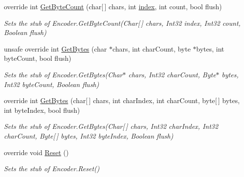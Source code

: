 \begin{DoxyCompactItemize}
override int \hyperlink{class_system_1_1_text_1_1_fakes_1_1_stub_encoder_a6904f965460c8aa5b7b448141afa6d9a}{Get\-Byte\-Count} (char\mbox{[}$\,$\mbox{]} chars, int \hyperlink{jquery-1_810_82-vsdoc_8js_a75bb12d1f23302a9eea93a6d89d0193e}{index}, int count, bool flush)
\begin{DoxyCompactList}\small\item\em Sets the stub of Encoder.\-Get\-Byte\-Count(\-Char\mbox{[}$\,$\mbox{]} chars, Int32 index, Int32 count, Boolean flush)\end{DoxyCompactList}\item 
unsafe override int \hyperlink{class_system_1_1_text_1_1_fakes_1_1_stub_encoder_ad76eecff905f03e290087c9421fff4e2}{Get\-Bytes} (char $\ast$chars, int char\-Count, byte $\ast$bytes, int byte\-Count, bool flush)
\begin{DoxyCompactList}\small\item\em Sets the stub of Encoder.\-Get\-Bytes(\-Char$\ast$ chars, Int32 char\-Count, Byte$\ast$ bytes, Int32 byte\-Count, Boolean flush)\end{DoxyCompactList}\item 
override int \hyperlink{class_system_1_1_text_1_1_fakes_1_1_stub_encoder_af9526ed6e028e567f70c28ab122bcc79}{Get\-Bytes} (char\mbox{[}$\,$\mbox{]} chars, int char\-Index, int char\-Count, byte\mbox{[}$\,$\mbox{]} bytes, int byte\-Index, bool flush)
\begin{DoxyCompactList}\small\item\em Sets the stub of Encoder.\-Get\-Bytes(\-Char\mbox{[}$\,$\mbox{]} chars, Int32 char\-Index, Int32 char\-Count, Byte\mbox{[}$\,$\mbox{]} bytes, Int32 byte\-Index, Boolean flush)\end{DoxyCompactList}\item 
override void \hyperlink{class_system_1_1_text_1_1_fakes_1_1_stub_encoder_ae102c4df4ce7463f2be9a742bca93f58}{Reset} ()
\begin{DoxyCompactList}\small\item\em Sets the stub of Encoder.\-Reset()\end{DoxyCompactList}\end{DoxyCompactItemize}
